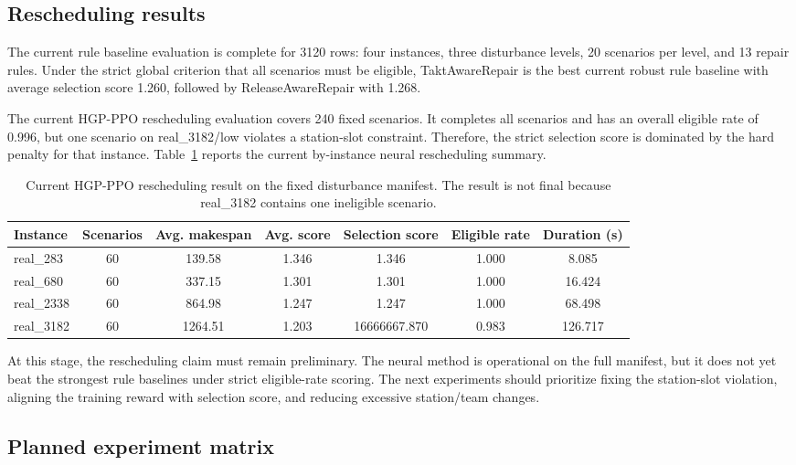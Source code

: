 \subsection{Rescheduling results}

The current rule baseline evaluation is complete for 3120 rows: four instances, three disturbance levels, 20 scenarios per level, and 13 repair rules. Under the strict global criterion that all scenarios must be eligible, TaktAwareRepair is the best current robust rule baseline with average selection score 1.260, followed by ReleaseAwareRepair with 1.268.

The current HGP-PPO rescheduling evaluation covers 240 fixed scenarios. It completes all scenarios and has an overall eligible rate of 0.996, but one scenario on real\_3182/low violates a station-slot constraint. Therefore, the strict selection score is dominated by the hard penalty for that instance. Table~\ref{tab:reschedule-current} reports the current by-instance neural rescheduling summary.

\begin{table}[t]
\centering
\caption{Current HGP-PPO rescheduling result on the fixed disturbance manifest. The result is not final because real\_3182 contains one ineligible scenario.}
\label{tab:reschedule-current}
\small
\setlength{\tabcolsep}{4pt}
\begin{tabular}{lcccccc}
\toprule
Instance & Scenarios & Avg. makespan & Avg. score & Selection score & Eligible rate & Duration (s)\\
\midrule
real\_283 & 60 & 139.58 & 1.346 & 1.346 & 1.000 & 8.085\\
real\_680 & 60 & 337.15 & 1.301 & 1.301 & 1.000 & 16.424\\
real\_2338 & 60 & 864.98 & 1.247 & 1.247 & 1.000 & 68.498\\
real\_3182 & 60 & 1264.51 & 1.203 & 16666667.870 & 0.983 & 126.717\\
\bottomrule
\end{tabular}
\end{table}

At this stage, the rescheduling claim must remain preliminary. The neural method is operational on the full manifest, but it does not yet beat the strongest rule baselines under strict eligible-rate scoring. The next experiments should prioritize fixing the station-slot violation, aligning the training reward with selection score, and reducing excessive station/team changes.

\subsection{Planned experiment matrix}

